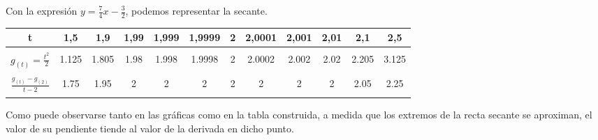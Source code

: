 Con la expresión $y = \frac{7}{4}x - \frac{3}{2}$, podemos representar la secante.

\begin{center}
\end{center}

\begin{center}
\begin{tabular}{ c c c c c c c c c c c c }
    t & 1,5 & 1,9 & 1,99 & 1,999 & 1,9999 & 2 & 2,0001 & 2,001 & 2,01 & 2,1 & 2,5\\
	\hline \\
    $g_{(t)} = \frac{t^2}{2}$ & 1.125 & 1.805 & 1.98 & 1.998 & 1.9998 & 2 & 2.0002 & 2.002 & 2.02 & 2.205 & 3.125 \\
    \vspace{10pt} \\
    $\frac{g_(t) - g_(2)}{t - 2}$ & 1.75 & 1.95 & 2 & 2 & 2 & 2 & 2 & 2 & 2 & 2.05 & 2.25\\
    \vspace{10pt} \\
    \hline
\end{tabular}
\end{center}

Como puede observarse tanto en las gráficas como en la tabla construida, a medida que los extremos de la recta secante se aproximan, el valor de su pendiente tiende al valor de la derivada en dicho punto.